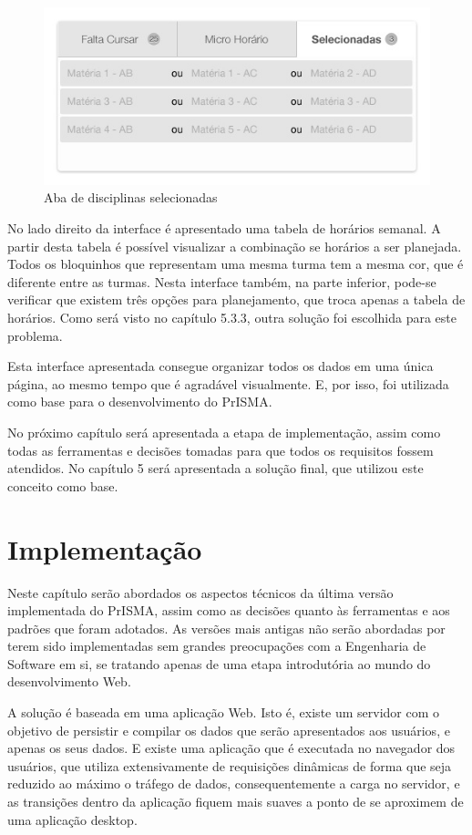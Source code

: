 \documentclass[graduacao,brazil]{ThesisPUC}
\begin{document}
\begin{figure}[H]
    \centering
    \includegraphics[width=0.8\linewidth]{img/selecionadas.jpg}
    \caption{Aba de disciplinas selecionadas}
\end{figure}

No lado direito da interface é apresentado uma tabela de horários semanal. A partir desta tabela é possível visualizar a combinação se horários a ser planejada. Todos os bloquinhos que representam uma mesma turma tem a mesma cor, que é diferente entre as turmas. Nesta interface também, na parte inferior, pode-se verificar que existem três opções para planejamento, que troca apenas a tabela de horários. Como será visto no capítulo 5.3.3, outra solução foi escolhida para este problema. 

Esta interface apresentada consegue organizar todos os dados em uma única página, ao mesmo tempo que é agradável visualmente. E, por isso, foi utilizada como base para o desenvolvimento do PrISMA. 

No próximo capítulo será apresentada a etapa de implementação, assim como todas as ferramentas e decisões tomadas para que todos os requisitos fossem atendidos. No capítulo 5 será apresentada a solução final, que utilizou este conceito como base.

\chapter{Implementação}

Neste capítulo serão abordados os aspectos técnicos da última versão implementada do PrISMA, assim como as decisões quanto às ferramentas e aos padrões que foram adotados. As versões mais antigas não serão abordadas por terem sido implementadas sem grandes preocupações com a Engenharia de Software em si, se tratando apenas de uma etapa introdutória ao mundo do desenvolvimento Web.

A solução é baseada em uma aplicação Web. Isto é, existe um servidor com o objetivo de persistir e compilar os dados que serão apresentados aos usuários, e apenas os seus dados. E existe uma aplicação que é executada no navegador dos usuários, que utiliza extensivamente de requisições dinâmicas de forma que seja reduzido ao máximo o tráfego de dados, consequentemente a carga no servidor, e as transições dentro da aplicação fiquem mais suaves a ponto de se aproximem de uma aplicação desktop.
\end{document}
